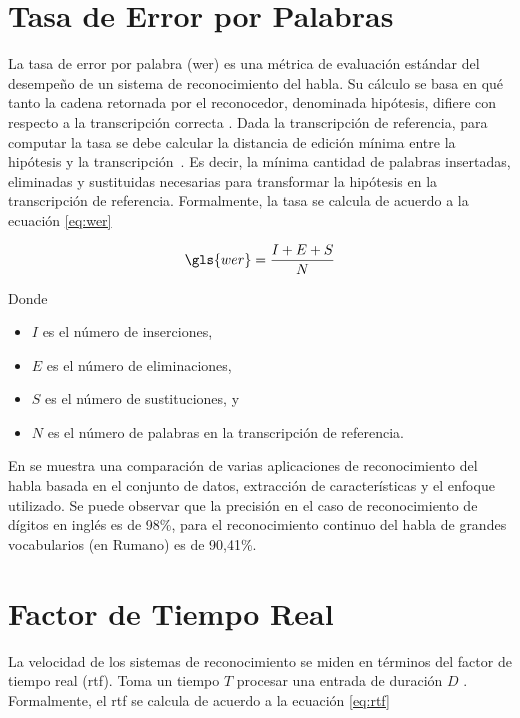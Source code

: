 \section{Tasa de Error por Palabras}
\label{sec:wer}

La tasa de error por palabra (\gls{wer}) es una m\'etrica de evaluaci\'on est\'andar del desempe\~no de un sistema de
reconocimiento del habla. Su c\'alculo se basa en qu\'e tanto la cadena retornada por el reconocedor,
denominada hip\'otesis, difiere con respecto a la transcripci\'on correcta \cite{Jurafsky}. 
Dada la transcripci\'on de referencia, para computar la tasa se debe calcular la distancia de edici\'on m\'inima
entre la hip\'otesis y la \mbox{transcripci\'on \cite{GaikwadAReview2010}}. Es decir, la m\'inima cantidad 
de palabras insertadas, eliminadas y sustituidas necesarias para transformar la hipótesis en la 
transcripción de referencia. Formalmente, la tasa se calcula de acuerdo a la ecuaci\'on \eqref{eq:wer}

\begin{equation}
\label{eq:wer}
    \gls{wer} = \frac{I + E + S}{N} 
\end{equation}

Donde

\begin{itemize}
    \item $I$ es el n\'umero de inserciones,
    \item $E$ es el n\'umero de eliminaciones,
    \item $S$ es el n\'umero de sustituciones, y
    \item $N$ es el n\'umero de palabras en la transcripci\'on de referencia.
\end{itemize}

En \cite{VimalaReview2012} se muestra una comparaci\'on de varias aplicaciones de reconocimiento del habla basada 
en el conjunto de datos, extracci\'on de caracter\'isticas y el enfoque utilizado. Se puede observar que la precisi\'on
en el caso de reconocimiento de d\'igitos en ingl\'es es de 98\%, para el reconocimiento continuo del habla
de grandes vocabularios (en Rumano) es de 90,41\%.

\section{Factor de Tiempo Real}
\label{sec:rtf}

La velocidad de los sistemas de reconocimiento se miden en t\'erminos del factor de tiempo real (\gls{rtf}). 
Toma un tiempo $T$ procesar una entrada de duraci\'on $D$ \cite{VimalaReview2012}. 
Formalmente, el \gls{rtf} se calcula de acuerdo a la ecuaci\'on \eqref{eq:rtf}

